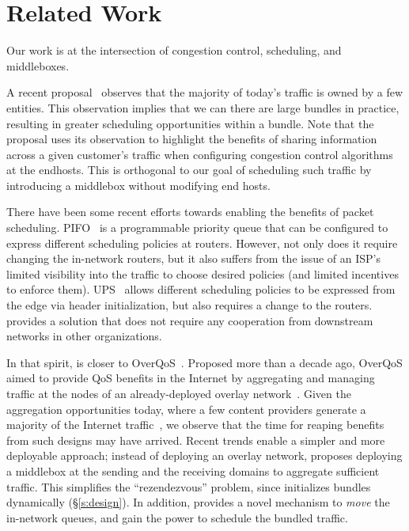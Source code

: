 \section{Related Work}
\label{s:related}

Our work is at the intersection of congestion control, scheduling, and middleboxes. 

 A recent proposal~\cite{fivecomps} observes that the majority of today's traffic is owned by a few entities.
This observation implies that we can there are large bundles in practice, resulting in greater scheduling opportunities within a bundle. Note that the proposal uses its observation to highlight the benefits of sharing information across a given customer's traffic when configuring congestion control algorithms at the endhosts. This is orthogonal to our goal of scheduling such traffic by introducing a middlebox without modifying end hosts.

 There have been some recent efforts towards enabling the benefits of packet scheduling. PIFO~\cite{pifo} is a programmable priority queue that can be configured to express different scheduling policies at routers. However, not only does it require changing the in-network routers, but it also suffers from the issue of an ISP's limited visibility into the traffic to choose desired policies (and limited incentives to enforce them). UPS~\cite{ups} allows different scheduling policies to be expressed from the edge via header initialization, but also requires a change to the routers.
\name provides a solution that does not require any cooperation from downstream networks in other organizations.

In that spirit, \name is closer to OverQoS~\cite{overqos}. Proposed more than a decade ago, OverQoS aimed to provide QoS benefits in the Internet by aggregating and managing traffic at the nodes of an already-deployed overlay network~\cite{ron}. 
Given the aggregation opportunities today, where a few content providers generate a majority of the Internet traffic~\cite{fivecomps}, we observe that the time for reaping benefits from such designs may have arrived. 
Recent trends enable a simpler and more deployable approach; instead of deploying an overlay network, \name{} proposes deploying a middlebox at the sending and the receiving domains to aggregate sufficient traffic. 
This simplifies the ``rezendezvous'' problem, since \name initializes bundles dynamically (\S\ref{s:design}).
In addition, \name provides a novel mechanism to \emph{move} the in-network queues, and gain the power to schedule the bundled traffic. 
